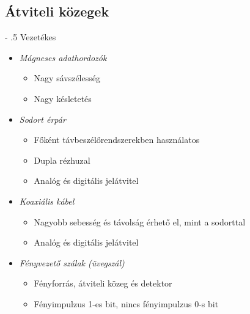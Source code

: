 \documentclass[12pt]{article}
\makeatletter
\renewcommand\paragraph{%
	\@startsection{paragraph}{4}{0mm}%
	{-\baselineskip}%
	{.5\baselineskip}%
	{\normalfont\normalsize\bfseries}}
\makeatother
\begin{document}
	\subsection*{Átviteli közegek}

	\paragraph{Vezetékes}

	\begin{itemize}[leftmargin=7.5mm]
        \renewcommand{\labelitemi}{$\vcenter{\hbox{\tiny$\bullet$}}$}
        \item \emph{Mágneses adathordozók}
	   \begin{itemize}[leftmargin=7.5mm]
            \renewcommand{\labelitemii}{$\vcenter{\hbox{\tiny$\circ$}}$}
            \item Nagy sávszélesség
            \item Nagy késletetés
        \end{itemize}
		\item \emph{Sodort érpár}
    	\begin{itemize}[leftmargin=7.5mm]
            \renewcommand{\labelitemii}{$\vcenter{\hbox{\tiny$\circ$}}$}
            \item Főként távbeszélőrendszerekben használatos
            \item Dupla rézhuzal
            \item Analóg és digitális jelátvitel
        \end{itemize}
		\item \emph{Koaxiális kábel}
    	\begin{itemize}[leftmargin=7.5mm]
            \renewcommand{\labelitemii}{$\vcenter{\hbox{\tiny$\circ$}}$}
            \item Nagyobb sebesség és távolság érhető el, mint a sodorttal
            \item Analóg és digitális jelátvitel
        \end{itemize}
        \item \emph{Fényvezető szálak (üvegszál)}
    	\begin{itemize}[leftmargin=7.5mm]
            \renewcommand{\labelitemii}{$\vcenter{\hbox{\tiny$\circ$}}$}
            \item Fényforrás, átviteli közeg és detektor
            \item Fényimpulzus 1-es bit, nincs	fényimpulzus 0-s bit
        \end{itemize}
    \end{itemize}
\end{document}
